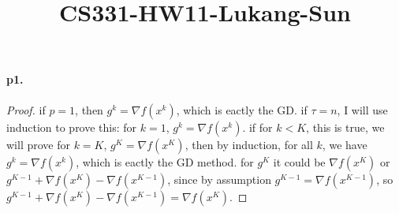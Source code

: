 \documentclass[12pt,a4paper]{article}
\title{CS331-HW11-Lukang-Sun}
\begin{document}
	\maketitle
	\paragraph{p1.}
	\begin{proof}
		if $p=1$, then $g^k=\nabla f(x^k)$, which is eactly the GD. if $\tau = n$,  I will use induction to
		 prove this: for $k=1$, $g^k=\nabla f(x^k)$. if for $k<K$, this is true, we will prove for $k=K$,
		  $g^K=\nabla f(x^K)$, then by induction, for all $k$, we have $g^k = \nabla f(x^k)$, which is
		   eactly the GD method.  for $g^K$ it could be $\nabla f(x^K)$ or $g^{K-1}+\nabla
		    f(x^K)-\nabla f(x^{K-1})$, since by assumption $g^{K-1}=\nabla f(x^{K-1})$, so
		     $g^{K-1}+\nabla f(x^K)-\nabla f(x^{K-1})=\nabla f(x^K)$. 
	\end{proof}
	
\end{document}
